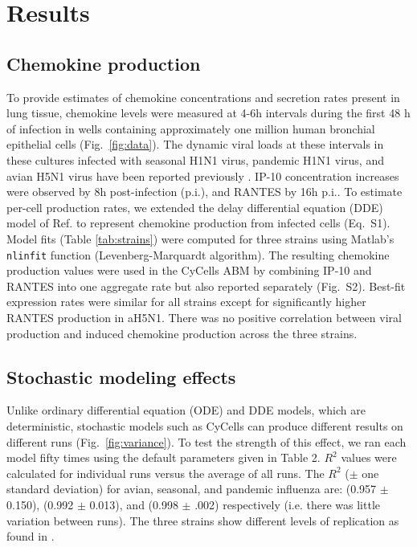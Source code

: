 \documentclass[10pt]{article}
\begin{document}
\section*{Results}

\subsection*{Chemokine production}

To provide estimates of chemokine concentrations and secretion rates present in lung tissue, chemokine levels were measured at 4-6h intervals during the first 48 h of infection in wells containing approximately one million human bronchial epithelial cells (Fig.~\ref{fig:data}).  The dynamic viral loads at these intervals in these cultures infected with seasonal H1N1 virus, pandemic H1N1 virus, and avian H5N1 virus have been reported previously \cite{Mitchell2011}.  IP-10 concentration increases were observed by 8h post-infection (p.i.), and RANTES by 16h p.i..  To estimate per-cell production rates, we extended the delay differential equation (DDE) model of Ref. \cite{Mitchell2011} to represent chemokine production from infected cells (Eq.~S1).  Model fits (Table \ref{tab:strains}) were computed for three strains using Matlab's \texttt{nlinfit} function (Levenberg-Marquardt algorithm).  The resulting chemokine production values were used in the CyCells ABM by combining IP-10 and RANTES into one aggregate rate but also reported separately (Fig.~S2).  Best-fit expression rates were similar for all strains except for significantly higher RANTES production in aH5N1.  There was no positive correlation between viral production and induced chemokine production across the three strains.


\subsection*{Stochastic modeling effects}

Unlike ordinary differential equation (ODE) and DDE models, which are deterministic, stochastic models such as CyCells can produce different results on different runs (Fig.~\ref{fig:variance}).  To test the strength of this effect, we ran each model fifty times using the default parameters given in Table 2.  $R^2$ values were calculated for individual runs versus the average of all runs.  The $R^2$ ($\pm$ one standard deviation) for avian, seasonal, and pandemic influenza are: (0.957 $\pm$ 0.150), (0.992 $\pm$ 0.013), and (0.998 $\pm$ .002) respectively (i.e. there was little variation between runs).  The three strains show different levels of replication as found in \cite{Mitchell2011}.  
\end{document}
